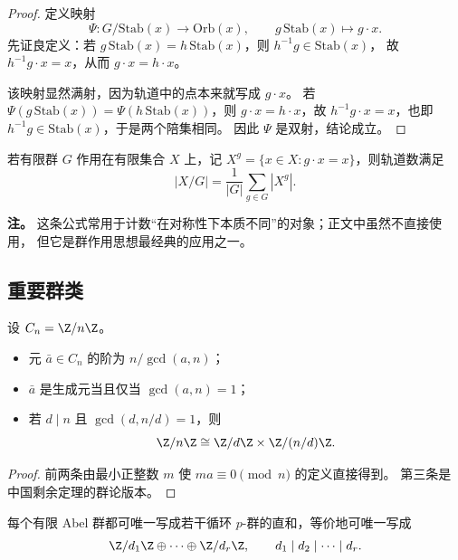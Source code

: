 \begin{proof}
定义映射
\[
  \Psi\colon G/\mathrm{Stab}(x)\to \mathrm{Orb}(x),
  \qquad
  g\,\mathrm{Stab}(x)\mapsto g\cdot x.
\]
先证良定义：若 $g\,\mathrm{Stab}(x)=h\,\mathrm{Stab}(x)$，则 $h^{-1}g\in\mathrm{Stab}(x)$，
故 $h^{-1}g\cdot x=x$，从而 $g\cdot x=h\cdot x$。

该映射显然满射，因为轨道中的点本来就写成 $g\cdot x$。
若 $\Psi(g\,\mathrm{Stab}(x))=\Psi(h\,\mathrm{Stab}(x))$，则 $g\cdot x=h\cdot x$，故
$h^{-1}g\cdot x=x$，也即 $h^{-1}g\in\mathrm{Stab}(x)$，于是两个陪集相同。
因此 $\Psi$ 是双射，结论成立。
\end{proof}

\begin{proposition}[Burnside 引理]
若有限群 $G$ 作用在有限集合 $X$ 上，记 $X^g=\{x\in X:g\cdot x=x\}$，则轨道数满足
\begin{equation}
  |X/G|=\frac{1}{|G|}\sum_{g\in G}|X^g|.
\end{equation}
\end{proposition}

\textbf{注。} 这条公式常用于计数“在对称性下本质不同”的对象；正文中虽然不直接使用，
但它是群作用思想最经典的应用之一。

\subsection{重要群类}

\begin{proposition}[循环群]
设 $C_n=\Z/n\Z$。
\begin{itemize}
  \item 元 $\bar a\in C_n$ 的阶为 $n/\gcd(a,n)$；
  \item $\bar a$ 是生成元当且仅当 $\gcd(a,n)=1$；
  \item 若 $d\mid n$ 且 $\gcd(d,n/d)=1$，则
  \begin{equation}
    \Z/n\Z \cong \Z/d\Z \times \Z/(n/d)\Z.
  \end{equation}
\end{itemize}
\end{proposition}

\begin{proof}
前两条由最小正整数 $m$ 使 $ma\equiv 0\pmod n$ 的定义直接得到。
第三条是中国剩余定理的群论版本。
\end{proof}

\begin{theorem}
每个有限 Abel 群都可唯一写成若干循环 $p$-群的直和，等价地可唯一写成
\begin{equation}
  \Z/d_1\Z\oplus\cdots\oplus \Z/d_r\Z,
  \qquad d_1\mid d_2\mid \cdots\mid d_r.
\end{equation}
\end{theorem}

